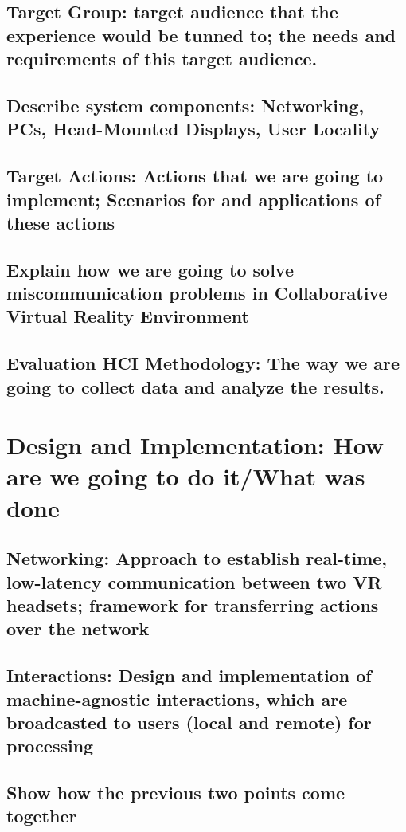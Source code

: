 \section{Target Group: target audience that the experience would be tunned to; the needs and requirements of this target audience.}

\section{Describe system components: Networking, PCs, Head-Mounted Displays, User Locality}

\section{Target Actions: Actions that we are going to implement; Scenarios for and applications of these actions}

\section{Explain how we are going to solve miscommunication problems in Collaborative Virtual Reality Environment}

\section{Evaluation HCI Methodology: The way we are going to collect data and analyze the results.}


\chapter{Design and Implementation: How are we going to do it/What was done}
\section{Networking: Approach to establish real-time, low-latency communication between two VR headsets; framework for transferring actions over the network}

\section{Interactions: Design and implementation of machine-agnostic interactions, which are broadcasted to users (local and remote) for processing}

\section{Show how the previous two points come together}


